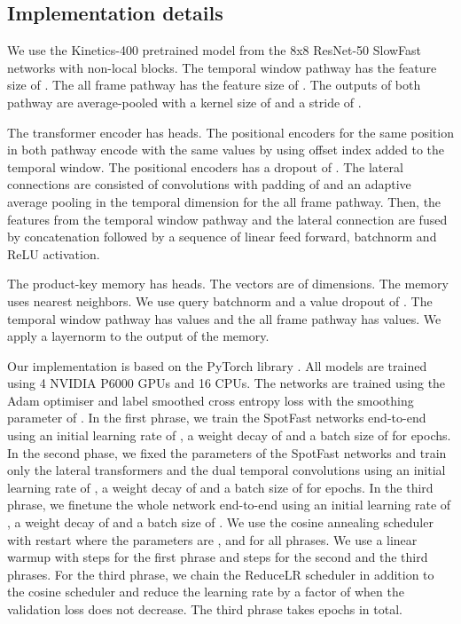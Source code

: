 \documentclass{article}
\begin{document}
\subsection{Implementation details}
We use the Kinetics-400 pretrained model from the 8x8 ResNet-50 SlowFast networks with non-local blocks. The temporal window pathway has the feature size of . The all frame pathway has the feature size of . The outputs of both pathway are average-pooled with a kernel size of  and a stride of . 

The transformer encoder has  heads. The positional encoders for the same position in both pathway encode with the same values by using offset index added to the temporal window. The positional encoders has a dropout of . The lateral connections are consisted of  convolutions with padding of  and an adaptive average pooling in the temporal dimension for the all frame pathway. Then, the features from the temporal window pathway and the lateral connection are fused by concatenation followed by a sequence of linear feed forward, batchnorm and ReLU activation. 

The product-key memory has  heads. The vectors are of  dimensions. The memory uses  nearest neighbors. We use query batchnorm and a value dropout of . The temporal window pathway has  values and the all frame pathway has  values. We apply a layernorm to the output of the memory. 

Our implementation is based on the PyTorch library \cite{paszke2019pytorch}. All models are trained using 4 NVIDIA P6000 GPUs and 16 CPUs. The networks are trained using the Adam optimiser \cite{kingma2014adam} and label smoothed cross entropy loss with the smoothing parameter of . In the first phrase, we train the SpotFast networks end-to-end using an initial learning rate of , a weight decay of  and a batch size of  for  epochs. In the second phase, we fixed the parameters of the SpotFast networks and train only the lateral transformers and the dual temporal convolutions using an initial learning rate of , a weight decay of  and a batch size of  for  epochs. In the third phrase, we finetune the whole network end-to-end using an initial learning rate of , a weight decay of  and a batch size of . We use the cosine annealing scheduler with restart \cite{loshchilov2016sgdr} where the parameters are ,  and  for all phrases. We use a linear warmup with  steps for the first phrase and  steps for the second and the third phrases. For the third phrase, we chain the ReduceLR scheduler in addition to the cosine scheduler and reduce the learning rate by a factor of  when the validation loss does not decrease. The third phrase takes  epochs in total.
\end{document}
